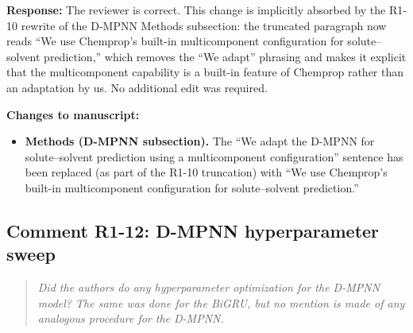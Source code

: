 \documentclass[11pt]{article}
\newenvironment{reviewer}{%
  \begin{quote}\itshape\color{black!70}}{%
  \end{quote}}
\newcommand{\response}[1]{\noindent\textbf{Response:} #1\par\medskip}
\newenvironment{changes}{%
  \noindent\textbf{Changes to manuscript:}
  \begin{itemize}[leftmargin=2em,itemsep=2pt]}{%
  \end{itemize}\medskip}
\begin{document}
\response{The reviewer is correct. This change is implicitly absorbed by the R1-10 rewrite of the D-MPNN Methods subsection: the truncated paragraph now reads ``We use Chemprop's built-in multicomponent configuration for solute--solvent prediction,'' which removes the ``We adapt'' phrasing and makes it explicit that the multicomponent capability is a built-in feature of Chemprop rather than an adaptation by us. No additional edit was required.}

\begin{changes}
  \item \textbf{Methods (D-MPNN subsection).} The ``We adapt the D-MPNN for solute--solvent prediction using a multicomponent configuration'' sentence has been replaced (as part of the R1-10 truncation) with ``We use Chemprop's built-in multicomponent configuration for solute--solvent prediction.''
\end{changes}

\subsection*{Comment R1-12: D-MPNN hyperparameter sweep}
\begin{reviewer}
Did the authors do any hyperparameter optimization for the D-MPNN model? The same was done for the BiGRU, but no mention is made of any analogous procedure for the D-MPNN.
\end{reviewer}
\end{document}
